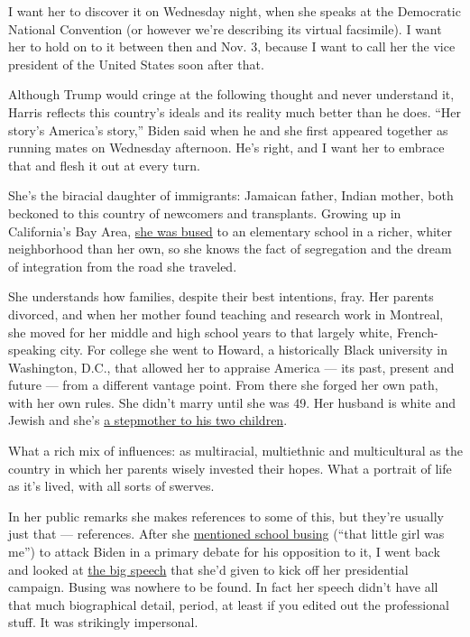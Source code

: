 I want her to discover it on Wednesday night, when she speaks at the
Democratic National Convention (or however we're describing its virtual
facsimile). I want her to hold on to it between then and Nov. 3, because
I want to call her the vice president of the United States soon after
that.

Although Trump would cringe at the following thought and never
understand it, Harris reflects this country's ideals and its reality
much better than he does. ``Her story's America's story,'' Biden said
when he and she first appeared together as running mates on Wednesday
afternoon. He's right, and I want her to embrace that and flesh it out
at every turn.

She's the biracial daughter of immigrants: Jamaican father, Indian
mother, both beckoned to this country of newcomers and transplants.
Growing up in California's Bay Area,
\href{https://www.nytimes3xbfgragh.onion/2019/06/30/us/politics/kamala-harris-berkeley-busing.html}{she
was bused} to an elementary school in a richer, whiter neighborhood than
her own, so she knows the fact of segregation and the dream of
integration from the road she traveled.

She understands how families, despite their best intentions, fray. Her
parents divorced, and when her mother found teaching and research work
in Montreal, she moved for her middle and high school years to that
largely white, French-speaking city. For college she went to Howard, a
historically Black university in Washington, D.C., that allowed her to
appraise America --- its past, present and future --- from a different
vantage point. From there she forged her own path, with her own rules.
She didn't marry until she was 49. Her husband is white and Jewish and
she's
\href{https://www.elle.com/culture/career-politics/a27422434/kamala-harris-stepmom-mothers-day/}{a
stepmother to his two children}.

What a rich mix of influences: as multiracial, multiethnic and
multicultural as the country in which her parents wisely invested their
hopes. What a portrait of life as it's lived, with all sorts of swerves.

In her public remarks she makes references to some of this, but they're
usually just that --- references. After she
\href{https://www.nytimes3xbfgragh.onion/2019/07/31/us/politics/kamala-harris-biden-busing.html}{mentioned
school busing} (``that little girl was me'') to attack Biden in a
primary debate for his opposition to it, I went back and looked at
\href{https://www.ktvu.com/news/transcript-kamala-harris-kicks-off-presidential-campaign-in-oakland}{the
big speech} that she'd given to kick off her presidential campaign.
Busing was nowhere to be found. In fact her speech didn't have all that
much biographical detail, period, at least if you edited out the
professional stuff. It was strikingly impersonal.

